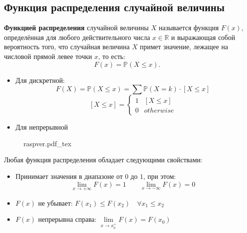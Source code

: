 \documentclass{article}
\newcommand{\R}{\mathbb{R}}
\newcommand{\PP}{\mathbb{P}}
\newcommand{\incfig}[2][1]{%
    \def\svgwidth{#1\columnwidth}
    {#2.pdf_tex}
}
\begin{document}
\subsection{Функция распределения случайной величины}
{\bf Функцией распределения} случайной величины $X$ называется функция $F(x),$ определённая для любого действительного числа $x \in \R$ и выражающая собой  вероятность того, что случайная величина $X$ примет значение, лежащее на числовой прямой левее точки $x$, то есть:
\[
F(x) = \PP(X \leq  x).
\]
\begin{itemize}
  \item Для дискретной:
  \[
    F(X) = \mathbb{P}(X \leq x) = \sum \mathbb{P}(X=k)\cdot [X \leq x]
  \]
  \[
  [X \leq x] = 
    \begin{cases}
       1 & [X \leq x] \\
       0 & otherwise
    \end{cases}
  \]
  \item Для непрерывной

\end{itemize}
\begin{figure}[h!]
  \centering
  \incfig{raspver}
\end{figure}
Любая функция распределения обладает следующими свойствами:
\begin{itemize}
  \item Принимает значения в диапазоне от $0$ до $1$, при этом:  
  \[
  \lim_{x \to +\infty} F(x)=1 \qquad \lim_{x \to -\infty} F(x) = 0
  \]
  \item $F(x)$ не убывает: $F(x_1) \leq F(x_2) \quad \forall x_1 \leq x_2$
  \item $F(x)$ непрерывна справа: $\lim\limits_{x \to x_0^+} F(x) = F(x_0)$
\end{itemize}



\end{document}
